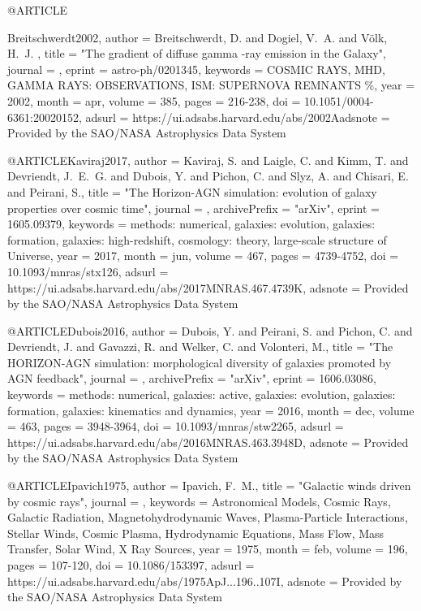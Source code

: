 \documentclass[useAMS,usenatbib]{mnras}
\begin{document}
{{{{{{{{{{{{@ARTICLE{Breitschwerdt2002,
   author = {{Breitschwerdt}, D. and {Dogiel}, V.~A. and {V{\"o}lk}, H.~J.
	},
    title = "{The gradient of diffuse gamma -ray emission in the Galaxy}",
  journal = {\aap},
   eprint = {astro-ph/0201345},
 keywords = {COSMIC RAYS, MHD, GAMMA RAYS: OBSERVATIONS, ISM: SUPERNOVA REMNANTS \%},
     year = 2002,
    month = apr,
   volume = 385,
    pages = {216-238},
      doi = {10.1051/0004-6361:20020152},
   adsurl = {https://ui.adsabs.harvard.edu/abs/2002Aadsnote = {Provided by the SAO/NASA Astrophysics Data System}
}

@ARTICLE{Kaviraj2017,
   author = {{Kaviraj}, S. and {Laigle}, C. and {Kimm}, T. and {Devriendt}, J.~E.~G. and 
	{Dubois}, Y. and {Pichon}, C. and {Slyz}, A. and {Chisari}, E. and 
	{Peirani}, S.},
    title = "{The Horizon-AGN simulation: evolution of galaxy properties over cosmic time}",
  journal = {\mnras},
archivePrefix = "arXiv",
   eprint = {1605.09379},
 keywords = {methods: numerical, galaxies: evolution, galaxies: formation, galaxies: high-redshift, cosmology: theory, large-scale structure of Universe},
     year = 2017,
    month = jun,
   volume = 467,
    pages = {4739-4752},
      doi = {10.1093/mnras/stx126},
   adsurl = {https://ui.adsabs.harvard.edu/abs/2017MNRAS.467.4739K},
  adsnote = {Provided by the SAO/NASA Astrophysics Data System}
}

@ARTICLE{Dubois2016,
   author = {{Dubois}, Y. and {Peirani}, S. and {Pichon}, C. and {Devriendt}, J. and 
	{Gavazzi}, R. and {Welker}, C. and {Volonteri}, M.},
    title = "{The HORIZON-AGN simulation: morphological diversity of galaxies promoted by AGN feedback}",
  journal = {\mnras},
archivePrefix = "arXiv",
   eprint = {1606.03086},
 keywords = {methods: numerical, galaxies: active, galaxies: evolution, galaxies: formation, galaxies: kinematics and dynamics},
     year = 2016,
    month = dec,
   volume = 463,
    pages = {3948-3964},
      doi = {10.1093/mnras/stw2265},
   adsurl = {https://ui.adsabs.harvard.edu/abs/2016MNRAS.463.3948D},
  adsnote = {Provided by the SAO/NASA Astrophysics Data System}
}

@ARTICLE{Ipavich1975,
   author = {{Ipavich}, F.~M.},
    title = "{Galactic winds driven by cosmic rays}",
  journal = {\apj},
 keywords = {Astronomical Models, Cosmic Rays, Galactic Radiation, Magnetohydrodynamic Waves, Plasma-Particle Interactions, Stellar Winds, Cosmic Plasma, Hydrodynamic Equations, Mass Flow, Mass Transfer, Solar Wind, X Ray Sources},
     year = 1975,
    month = feb,
   volume = 196,
    pages = {107-120},
      doi = {10.1086/153397},
   adsurl = {https://ui.adsabs.harvard.edu/abs/1975ApJ...196..107I},
  adsnote = {Provided by the SAO/NASA Astrophysics Data System}
}

}}}}}}}}}}}}}
\end{document}
